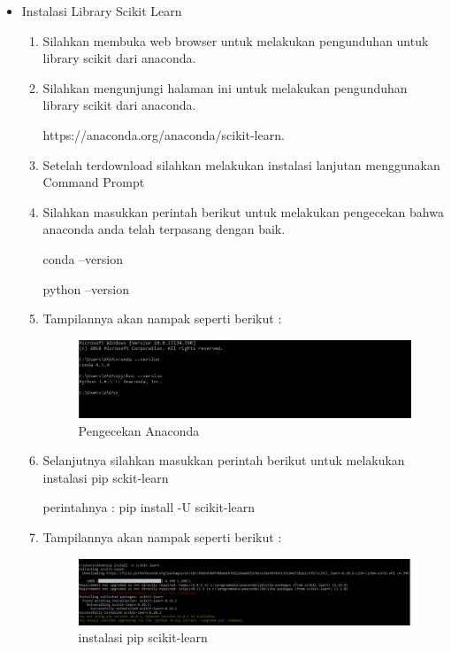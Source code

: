 \begin{itemize}
\item Instalasi Library Scikit Learn
\begin{enumerate}
\item Silahkan membuka web browser untuk melakukan pengunduhan untuk library scikit dari anaconda.
\item Silahkan mengunjungi halaman ini untuk melakukan pengunduhan library scikit dari anaconda.
\par https://anaconda.org/anaconda/scikit-learn.
\item Setelah terdownload silahkan melakukan instalasi lanjutan menggunakan Command Prompt
\item Silahkan masukkan perintah berikut untuk melakukan pengecekan bahwa anaconda anda telah terpasang dengan baik.
\par conda --version
\par python --version
\item Tampilannya akan nampak seperti berikut :
\par

\begin{figure}[ht]
\centering
\includegraphics[scale=0.3]{figures/scikit1.JPG}
\caption{Pengecekan Anaconda}
\label{contoh}
\end{figure}

\par
\item Selanjutnya silahkan masukkan perintah berikut untuk melakukan instalasi pip sckit-learn
\par perintahnya : pip install -U scikit-learn
\item Tampilannya akan nampak seperti berikut :
\par

\begin{figure}[ht]
\centering
\includegraphics[scale=0.2]{figures/scikit3.jpg}
\caption{instalasi pip scikit-learn}
\label{contoh}
\end{figure}


\end{enumerate}
\end{itemize}
